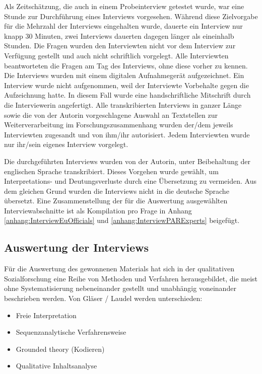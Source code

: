 Als Zeitschätzung, die auch in einem Probeinterview getestet wurde, war eine Stunde zur Durchführung eines Interviews vorgesehen. Während diese Zielvorgabe für die Mehrzahl der Interviews eingehalten wurde, dauerte ein Interview nur knapp 30 Minuten, zwei Interviews dauerten dagegen länger als eineinhalb Stunden. Die Fragen wurden den Interviewten nicht vor dem Interview zur Verfügung gestellt und auch nicht schriftlich vorgelegt. Alle Interviewten beantworteten die Fragen am Tag des Interviews, ohne diese vorher zu kennen. Die Interviews wurden mit einem digitalen Aufnahmegerät aufgezeichnet. Ein Interview wurde nicht aufgenommen, weil der Interviewte Vorbehalte gegen die Aufzeichnung hatte. In diesem Fall wurde eine handschriftliche Mitschrift durch die Interviewerin angefertigt. Alle transkribierten Interviews in ganzer Länge sowie die von der Autorin vorgeschlagene Auswahl an Textstellen zur Weiterverarbeitung im Forschungszusammenhang wurden der/dem jeweils Interviewten zugesandt und von ihm/ihr autorisiert. Jedem Interviewten wurde nur ihr/sein eigenes Interview vorgelegt.\par
Die durchgeführten Interviews wurden von der Autorin, unter Beibehaltung der englischen Sprache transkribiert. Dieses Vorgehen wurde gewählt, um Interpretations- und Deutungsverluste durch eine Übersetzung zu vermeiden. Aus dem gleichen Grund wurden die Interviews nicht in die deutsche Sprache übersetzt. Eine Zusammenstellung der für die Auswertung ausgewählten Interviewabschnitte ist als Kompilation pro Frage in Anhang \ref{anhang:InterviewEuOfficials} und \ref{anhang:InterviewPARExperts} beigefügt.

\subsection{Auswertung der Interviews}
Für die Auswertung des gewonnenen Materials hat sich in der qualitativen Sozialforschung eine Reihe von Methoden und Verfahren herausgebildet, die meist ohne Systematisierung nebeneinander gestellt und unabhängig voneinander beschrieben werden. Von Gläser / Laudel werden unterschieden:
\begin{itemize}
\item Freie Interpretation
\item Sequenzanalytische Verfahrensweise
\item Grounded theory (Kodieren)
\item Qualitative Inhaltsanalyse
\end{itemize}

